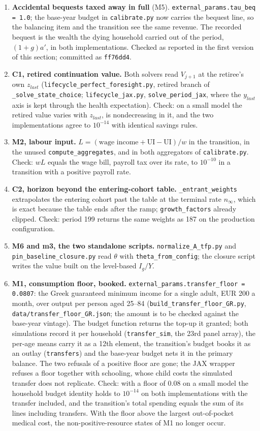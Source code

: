 \documentclass[11pt,a4paper]{article}
\newcommand{\code}[1]{\texttt{#1}}
\begin{document}
\begin{enumerate}[label=p\arabic*.]
\item \textbf{Accidental bequests taxed away in full} (M5). \code{external_params.tau_beq = 1.0}; the base-year budget in \code{calibrate.py} now carries the bequest line, so the balancing item and the transition see the same revenue. The recorded bequest is the wealth the dying household carried out of the period, $(1+g)a'$, in both implementations. Checked as reported in the first version of this section; committed as \code{ff76dd4}.
\item \textbf{C1, retired continuation value.} Both solvers read $V_{j+1}$ at the retiree's own $z_{last}$ (\code{lifecycle_perfect_foresight.py}, retired branch of \code{_solve_state_choice}; \code{lifecycle_jax.py}, \code{solve_period_jax}, where the $y_{last}$ axis is kept through the health expectation). Check: on a small model the retired value varies with $z_{last}$, is nondecreasing in it, and the two implementations agree to $10^{-14}$ with identical savings rules.
\item \textbf{M2, labour input.} $L = (\text{wage income} + \mathrm{UI} - \mathrm{UI})/w$ in the transition, in the unused \code{compute_aggregates}, and in both aggregators of \code{calibrate.py}. Check: $wL$ equals the wage bill, payroll tax over its rate, to $10^{-10}$ in a transition with a positive payroll rate.
\item \textbf{C2, horizon beyond the entering-cohort table.} \code{_entrant_weights} extrapolates the entering cohort past the table at the terminal rate $n_\infty$, which is exact because the table ends after the ramp; \code{growth_factors} already clipped. Check: period 199 returns the same weights as 187 on the production configuration.
\item \textbf{M6 and m3, the two standalone scripts.} \code{normalize_A_tfp.py} and \code{pin_baseline_closure.py} read $\theta$ with \code{theta_from_config}; the closure script writes the value built on the level-based $I_g/Y$.
\item \textbf{M1, consumption floor, booked.} \code{external_params.transfer_floor = 0.0807}: the Greek guaranteed minimum income for a single adult, EUR 200 a month, over output per person aged 25--84 (\code{build_transfer_floor_GR.py}, \code{data/transfer_floor_GR.json}; the amount is to be checked against the base-year vintage). The budget function returns the top-up it granted; both simulations record it per household (\code{transfer_sim}, the 23rd panel array), the per-age means carry it as a 12th element, the transition's budget books it as an outlay (\code{transfers}) and the base-year budget nets it in the primary balance. The two refusals of a positive floor are gone; the JAX wrapper refuses a floor together with schooling, whose child costs the simulated transfer does not replicate. Check: with a floor of 0.08 on a small model the household budget identity holds to $10^{-14}$ on both implementations with the transfer included, and the transition's total spending equals the sum of its lines including transfers. With the floor above the largest out-of-pocket medical cost, the non-positive-resource states of M1 no longer occur.

\end{enumerate}
\end{document}

